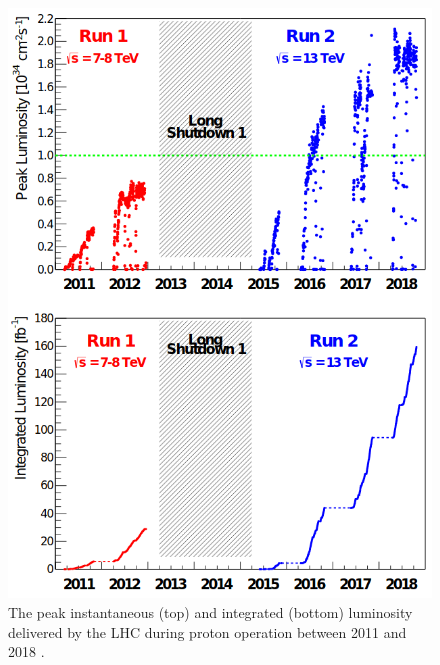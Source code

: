 \begin{figure}[hbtp]
\centering
\includegraphics[scale=0.4]{figures/lhc_and_cms/lhc_lumi.png}
\caption{The peak instantaneous (top) and integrated (bottom) luminosity delivered by the LHC during proton operation between 2011 and 2018 \cite{lhc_run2_operation}.}
\label{lhc_lumi}
\end{figure}